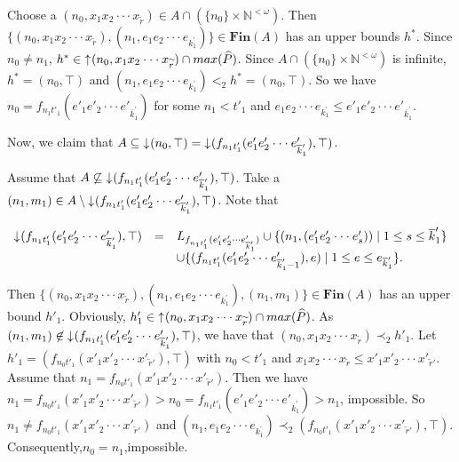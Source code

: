 \documentclass[preprint,12pt]{elsarticle}
\numberwithin{equation}{section}
\newcommand{\dn}{\mathord{\downarrow}\hspace{0.05em}}
\newcommand{\up}{\mathord{\uparrow}\hspace{0.05em}}
\begin{document}
Choose a $(n_{0},x_{1}x_{2}\cdot\cdot\cdot x_{\widetilde{r}})\in A\cap (\{n_{0}\}\times \mathbb{N}^{<\omega})$. Then $\{(n_{0},x_{1}x_{2}\cdot\cdot\cdot x_{\widetilde{r}}),(n_{1},e_{1}e_{2}\cdot\cdot\cdot e_{k_{1}^{\prime}})\}\in \mathbf{Fin}(A)$ has an upper bounds $h^{\ast}$. Since $n_{0}\neq n_{1}$, $h^{\ast}\in\up(n_{0},x_{1}x_{2}\cdot\cdot\cdot x_{\widetilde{r}})\cap max(\widehat{P})$.
Since $A\cap (\{n_{0}\}\times \mathbb{N}^{<\omega})$ is infinite, $h^{\ast}=(n_{0},\top)$ and $(n_{1},e_{1}e_{2}\cdot\cdot\cdot e_{k_{1}^{\prime}})<_{2}h^{\ast}=(n_{0},\top)$. So we have $n_{0}=f_{n_{1}t'_{1}}(e'_{1}e'_{2}\cdot\cdot\cdot e'_{\overline{k}_{1}^{\prime}})$ for some $n_{1}<t'_{1}$ and $e_{1}e_{2}\cdot\cdot\cdot e_{k_{1}^{\prime}}\leq e'_{1}e'_{2}\cdot\cdot\cdot e'_{\overline{k}_{1}^{\prime}}$.

Now, we claim that $A\subseteq\dn(n_{0},\top)=\dn(f_{n_{1}t'_{1}}(e'_{1}e'_{2}\cdot\cdot\cdot e'_{\overline{k}_{1}^{\prime}}),\top)$.

Assume that $A\not\subseteq\dn(f_{n_{1}t'_{1}}(e'_{1}e'_{2}\cdot\cdot\cdot e'_{\overline{k}_{1}^{\prime}}),\top)$. Take a $(n_{1},m_{1})\in A\setminus\dn(f_{n_{1}t'_{1}}(e'_{1}e'_{2}\cdot\cdot\cdot e'_{\overline{k}_{1}^{\prime}}),\top)$. Note that

 \begin{center}$\begin{array}{lll}
\dn(f_{n_{1}t'_{1}}(e'_{1}e'_{2}\cdot\cdot\cdot e'_{\overline{k}_{1}^{\prime}}),\top)&=&L_{f_{n_{1}t'_{1}}(e'_{1}e'_{2}\cdot\cdot\cdot e'_{\overline{k}_{1}^{\prime}})}\cup\{(n_{1},(e'_{1}e'_{2}\cdot\cdot\cdot e'_{s}))\mid 1\leq s\leq \overline{k}_{1}^{\prime}\}\\
&&\cup\{(f_{n_{1}t'_{1}}(e'_{1}e'_{2}\cdot\cdot\cdot e'_{\overline{k}_{1}^{\prime}-1}),e)\mid 1\leq e\leq e_{\overline{k}_{1}^{\prime}}\}.\\
\end{array}$\end{center}

Then $\{(n_{0},x_{1}x_{2}\cdot\cdot\cdot x_{\widetilde{r}}),(n_{1},e_{1}e_{2}\cdot\cdot\cdot e_{k_{1}^{\prime}}),(n_{1},m_{1})\}\in\mathbf{Fin}(A)$ has an upper bound $h'_{1}$. Obviously, $h'_{1}\in\up(n_{0},x_{1}x_{2}\cdot\cdot\cdot x_{\widetilde{r}})\cap max(\widehat{P})$. As $(n_{1},m_{1})\not\in\dn(f_{n_{1}t'_{1}}(e'_{1}e'_{2}\cdot\cdot\cdot e'_{\overline{k}_{1}^{\prime}}),\top)$, we have that $(n_{0},x_{1}x_{2}\cdot\cdot\cdot x_{\widetilde{r}})\prec_{2} h'_{1}$. Let $h'_{1}=(f_{n_{0}t'_{1}}(x'_{1}x'_{2}\cdot\cdot\cdot x'_{\widetilde{r}'}),\top)$ with $n_{0}<t'_{1}$ and $x_{1}x_{2}\cdot\cdot\cdot x_{\widetilde{r}}\leq x'_{1}x'_{2}\cdot\cdot\cdot x'_{\widetilde{r}'}$. Assume that $n_{1}=f_{n_{0}t'_{1}}(x'_{1}x'_{2}\cdot\cdot\cdot x'_{\widetilde{r}'})$. Then we have $n_{1}=f_{n_{0}t'_{1}}(x'_{1}x'_{2}\cdot\cdot\cdot x'_{\widetilde{r}'})>n_{0}=f_{n_{1}t'_{1}}(e'_{1}e'_{2}\cdot\cdot\cdot e'_{\overline{k}_{1}^{\prime}})>n_{1}$, impossible. So $n_{1}\neq f_{n_{0}t'_{1}}(x'_{1}x'_{2}\cdot\cdot\cdot x'_{\widetilde{r}'})$ and $(n_{1},e_{1}e_{2}\cdot\cdot\cdot e_{k_{1}^{\prime}})\prec_{2}(f_{n_{0}t'_{1}}(x'_{1}x'_{2}\cdot\cdot\cdot x'_{\widetilde{r}'}),\top)$. Consequently,$n_{0}=n_{1}$,impossible.
\end{document}
